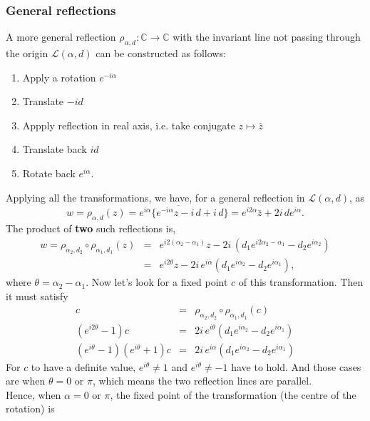 \documentclass{article}
\begin{document}
\subsubsection{General reflections}
\label{sec-3-1-2}
A more general reflection $\rho_{\alpha,d}:\mathbb{C} \rightarrow \mathbb{C}$ with the invariant line not passing through the origin $\mathcal{L}(\alpha, d)$ can be constructed as follows:
\begin{enumerate}
\item Apply a rotation $e^{-i\alpha}$
\item Translate $-id$
\item Appply reflection in real axis, i.e. take conjugate $z \mapsto \bar{z}$
\item Translate back $id$
\item Rotate back $e^{i\alpha}$.
\end{enumerate}
Applying all the transformations, we have, for a general reflection in $\mathcal{L}(\alpha, d)$, as
\begin{equation}
w = \rho_{\alpha,d} (z) = e^{i\alpha}\{ \overline{e^{-i\alpha} z - i\,d} + i\,d \} = e^{i2\alpha} \bar{z} + 2i \, de^{i\alpha}.
\end{equation}
The product of \textbf{two} such reflections is,
\begin{eqnarray}
w = \rho_{\alpha_{2}, d_{2}} \circ \rho_{\alpha_{1},d_{1}} (z) &=& e^{i2(\alpha_{2} - \alpha_{1})} z - 2i \, ( d_{1} e^{i2\alpha_{2} - \alpha_{1}} - d_{2} e^{i\alpha_{2}})  \nonumber \\
&=& e^{i2\theta} z - 2i \, e^{i\alpha}( d_{1} e^{i\alpha_{2}} - d_{2} e^{i\alpha_{1}}),
\end{eqnarray}
where $\theta = \alpha_{2} - \alpha_{1}$. Now let's look for a fixed point $c$ of this transformation. Then it must satisfy
\begin{eqnarray}
c &=&  \rho_{\alpha_{2}, d_{2}} \circ \rho_{\alpha_{1},d_{1}} (c) \nonumber \\
(e^{i2\theta} - 1)c &=&  2i \, e^{i\theta}( d_{1} e^{i\alpha_{2}} - d_{2} e^{i\alpha_{1}}) \nonumber  \\
(e^{i\theta} - 1)(e^{i\theta} + 1)c &=&  2i \, e^{i\alpha}( d_{1} e^{i\alpha_{2}} - d_{2} e^{i\alpha_{1}}) \nonumber 
\end{eqnarray}
For $c$ to have a definite value, $e^{i\theta} \ne 1$  and $e^{i\theta} \ne -1$ have to hold. And those cases are when $\theta = 0$ or $\pi$, which means the two reflection lines are parallel.\\
Hence, when $\alpha = 0$ or $\pi$, the fixed point of the transformation (the centre of the rotation) is
\end{document}
